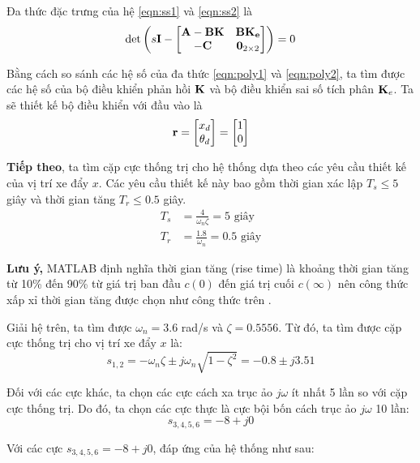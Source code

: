 \documentclass[12pt,a4paper]{article}
\begin{document}
Đa thức đặc trưng của hệ \eqref{eqn:ss1} và \eqref{eqn:ss2} là
\begin{align}
    \det \left(s\vb I -  \begin{bmatrix}
        \vb{A - BK} & \vb{BK_e}\\
        \vb{-C} & \vb{0}_{2\times 2}
    \end{bmatrix}\right) = 0 \label{eqn:poly2}
\end{align}

Bằng cách so sánh các hệ số của đa thức \eqref{eqn:poly1} và \eqref{eqn:poly2}, ta tìm được các hệ số của bộ điều khiển phản hồi $\vb K$ và bộ điều khiển sai số tích phân $\vb K_e$. Ta sẽ thiết kế bộ điều khiển với đầu vào là
\begin{align}
    \vb r = \begin{bmatrix}
        x_d \\
        \theta_d
    \end{bmatrix} = \begin{bmatrix}
        1 \\ 0
    \end{bmatrix}
\end{align}

\textbf{Tiếp theo}, ta tìm cặp cực thống trị cho hệ thống dựa theo các yêu cầu thiết kế của vị trí xe đẩy $x$. Các yêu cầu thiết kế này bao gồm thời gian xác lập $T_s \le 5$ giây và thời gian tăng $T_r\le 0.5$ giây. 
\begin{align*}
    T_s &= \frac{4}{\omega_n\zeta} = 5\text{ giây}\\
    T_r &= \frac{1.8}{\omega_n} = 0.5\text{ giây}
\end{align*} 

\textbf{Lưu ý,} MATLAB định nghĩa thời gian tăng (rise time) là khoảng thời gian tăng từ 10\% đến 90\% từ giá trị ban đầu $c(0)$ đến giá trị cuối $c(\infty)$ \cite{matlabstepinfo} nên công thức xấp xỉ thời gian tăng được chọn như công thức trên \cite{sundaram2014ece380}.

Giải hệ trên, ta tìm được $\omega_n = 3.6$ rad/s và $\zeta = 0.5556$. Từ đó, ta tìm được cặp cực thống trị cho vị trí xe đẩy $x$ là:
$$s_{1,2} = -\omega_n\zeta \pm j \omega_n\sqrt{1-\zeta^2} = -0.8\pm j3.51$$

Đối với các cực khác, ta chọn các cực cách xa trục ảo $j\omega$ ít nhất 5 lần so với cặp cực thống trị. Do đó, ta chọn các cực thực là cực bội bốn cách trục ảo $j\omega$ 10 lần:
$$s_{3,4,5,6} = -8 +j0$$


Với các cực $s_{3,4,5,6} = -8 +j0$, đáp ứng của hệ thống như sau:
\end{document}
